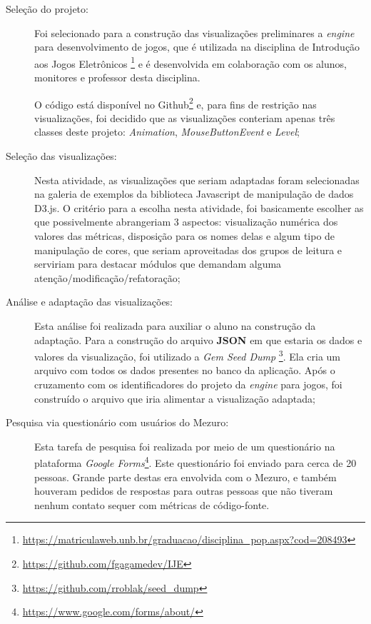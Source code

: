 \begin{description}
  \item [Seleção do projeto:]
    Foi selecionado para a construção das visualizações preliminares a
    \textit{engine} para desenvolvimento de jogos, que é utilizada na disciplina
    de Introdução aos Jogos Eletrônicos
    \footnote{\url{https://matriculaweb.unb.br/graduacao/disciplina_pop.aspx?cod=208493}}
     e é desenvolvida em colaboração com os alunos, monitores e professor desta
     disciplina.

     O código está disponível no Github\footnote{\url{https://github.com/fgagamedev/IJE}}
     e, para fins de restrição nas visualizações, foi decidido que as
     visualizações conteriam apenas três classes deste projeto: \textit{Animation},
     \textit{MouseButtonEvent} e \textit{Level};

  \item [Seleção das visualizações:]
    Nesta atividade, as visualizações que seriam adaptadas foram selecionadas na
    galeria de exemplos da biblioteca Javascript de manipulação de dados D3.js.
    O critério para a escolha nesta atividade, foi basicamente escolher as que
    possivelmente abrangeriam 3 aspectos: visualização numérica dos valores das
    métricas, disposição para os nomes delas e algum tipo de manipulação de
    cores, que seriam aproveitadas dos grupos de leitura e serviriam para
    destacar módulos que demandam alguma atenção/modificação/refatoração;

  \item [Análise e adaptação das visualizações:]
    Esta análise foi realizada para auxiliar o aluno na construção da adaptação.
    Para a construção do arquivo \textbf{JSON} em que estaria os dados e valores
    da visualização, foi utilizado a \textit{Gem Seed Dump}
    \footnote{\url{https://github.com/rroblak/seed_dump}}. Ela cria um arquivo
    com todos os dados presentes no banco da aplicação. Após o cruzamento com
    os identificadores do projeto da \textit{engine} para jogos, foi construído
    o arquivo que iria alimentar a visualização adaptada;

  \item [Pesquisa via questionário com usuários do Mezuro:]
    Esta tarefa de pesquisa foi realizada por meio de um questionário na
    plataforma \textit{Google Forms}\footnote{\url{https://www.google.com/forms/about/}}.
    Este questionário foi enviado para cerca de 20 pessoas. Grande parte destas
    era envolvida com o Mezuro, e também houveram pedidos de respostas para
    outras pessoas que não tiveram nenhum contato sequer com métricas de
    código-fonte.


\end{description}
